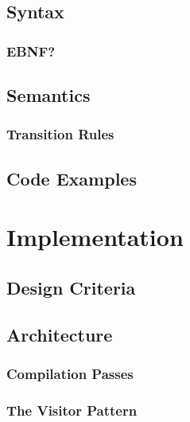 \section{Syntax}
\subsection{EBNF?}
\section{Semantics}
\subsection{Transition Rules}
\section{Code Examples}

\renewcommand{\ind}[1]{}
\chapter{Implementation}
\label{chap:implementation}
\section{Design Criteria}
\section{Architecture}
\ind{Architecture}	
\ind{Hardware}
\ind{OverviewCompiler}
\ind{languageprocessing}
\subsection{Compilation Passes}
\label{sec:CompilationPasses}
\ind{AbstractSyntaxTrees}
\ind{ParseTree}
\subsection{The Visitor Pattern}
\ind{SyntacticAnalysis}
\ind{KnownLexersAndParsers}
\ind{ANTLR}
\ind{LexicalAnalyzer}
\ind{Tokens}
\ind{Parser}
\ind{ContextualAnalysis}
